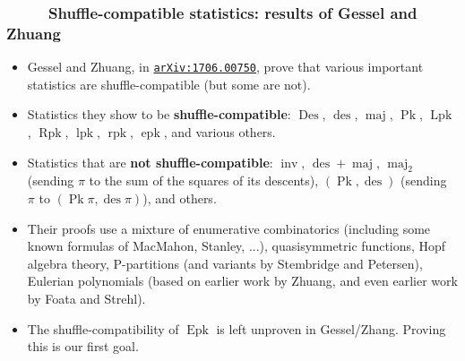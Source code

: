 \documentclass{beamer}
\newcommand{\red}{\color{red}}
\newcommand{\Lpk}{\operatorname{Lpk}}
\newcommand{\lpk}{\operatorname{lpk}}
\newcommand{\Rpk}{\operatorname{Rpk}}
\newcommand{\rpk}{\operatorname{rpk}}
\newcommand{\Pk}{\operatorname{Pk}}
\newcommand{\Epk}{\operatorname{Epk}}
\newcommand{\epk}{\operatorname{epk}}
\newcommand{\Des}{\operatorname{Des}}
\newcommand{\des}{\operatorname{des}}
\newcommand{\maj}{\operatorname{maj}}
\newcommand\arxiv[1]{\href{http://www.arxiv.org/abs/#1}{\texttt{arXiv:#1}}}
\newcommand{\fti}[1]{\frametitle{\ \ \ \ \ #1}}
\newcommand{\tup}[1]{\left( #1 \right)}
\theoremstyle{plain}
\begin{document}
\begin{frame}
\fti{Shuffle-compatible statistics: results of Gessel and Zhuang}

\begin{itemize}

\item Gessel and Zhuang, in {\red \arxiv{1706.00750}}, prove that
      various important statistics are shuffle-compatible (but some
      are not).

\pause

\item Statistics they show to be \textbf{shuffle-compatible}: $\Des$, $\des$,
      $\maj$, $\Pk$, $\Lpk$, $\Rpk$, $\lpk$, $\rpk$, $\epk$,
      and various others.

\pause

\item Statistics that are \textbf{not shuffle-compatible}:
      $\operatorname{inv}$, $\des + \maj$, $\maj_2$ (sending $\pi$
      to the sum of the squares of its descents),
      $\tup{\Pk, \des}$ (sending $\pi$ to $\tup{\Pk\pi, \des\pi}$),
      and others.

\pause 

\item Their proofs use a mixture of enumerative combinatorics
      (including some known formulas of MacMahon, Stanley, ...),
      quasisymmetric functions, Hopf algebra theory,
      P-partitions (and variants by Stembridge and Petersen),
      Eulerian polynomials (based on earlier work by Zhuang,
      and even earlier work by Foata and Strehl).

\pause

\item The shuffle-compatibility of $\Epk$ is left unproven
      in Gessel/Zhang. Proving this is our first goal.

\end{itemize}

\end{frame}
\end{document}
